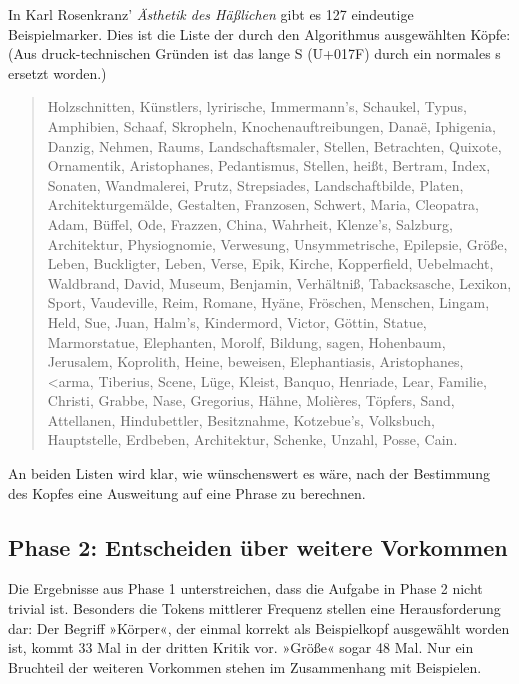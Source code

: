 \documentclass{article}
\newcommand*{\lit}{\textit}%
\begin{document}
In Karl Rosenkranz' \lit{Ästhetik des
  Häßlichen} \parencite{Rosenkranz1853a} gibt es 127 eindeutige
Beispielmarker. Dies ist die Liste der durch den Algorithmus
ausgewählten Köpfe: (Aus druck-technischen Gründen ist das lange S
(U+017F) durch ein normales s ersetzt worden.)

\begin{quote}
  Holzschnitten, Künstlers, lyrirische, Immermann's, Schaukel, Typus,
  Amphibien, Schaaf, Skropheln, Knochenauftreibungen, Danaë,
  Iphigenia, Danzig, Nehmen, Raums, Landschaftsmaler, Stellen,
  Betrachten, Quixote, Ornamentik, Aristophanes, Pedantismus, Stellen,
  heißt, Bertram, Index, Sonaten, Wandmalerei, Prutz, Strepsiades,
  Landschaftbilde, Platen, Architekturgemälde, Gestalten, Franzosen,
  Schwert, Maria, Cleopatra, Adam, Büffel, Ode, Frazzen, China,
  Wahrheit, Klenze's, Salzburg, Architektur, Physiognomie, Verwesung,
  Unsymmetrische, Epilepsie, Größe, Leben, Buckligter, Leben, Verse,
  Epik, Kirche, Kopperfield, Uebelmacht, Waldbrand, David, Museum,
  Benjamin, Verhältniß, Tabacksasche, Lexikon, Sport, Vaudeville,
  Reim, Romane, Hyäne, Fröschen, Menschen, Lingam, Held, Sue, Juan,
  Halm's, Kindermord, Victor, Göttin, Statue, Marmorstatue,
  Elephanten, Morolf, Bildung, sagen, Hohenbaum, Jerusalem, Koprolith,
  Heine, beweisen, Elephantiasis, Aristophanes,
  \foreignlanguage{polutonikogreek}{<arma}, %
  Tiberius, Scene, Lüge, Kleist, Banquo, Henriade, Lear, Familie,
  Christi, Grabbe, Nase, Gregorius, Hähne, Molières, Töpfers, Sand,
  Attellanen, Hindubettler, Besitznahme, Kotzebue's, Volksbuch,
  Hauptstelle, Erdbeben, Architektur, Schenke, Unzahl, Posse, Cain.
\end{quote}

An beiden Listen wird klar, wie wünschenswert es wäre, nach der
Bestimmung des Kopfes eine Ausweitung auf eine Phrase zu berechnen.

\subsection{Phase 2: Entscheiden über weitere Vorkommen}

Die Ergebnisse aus Phase 1 unterstreichen, dass die Aufgabe in Phase 2
nicht trivial ist. Besonders die Tokens mittlerer Frequenz stellen
eine Herausforderung dar: Der Begriff »Körper«, der einmal korrekt als
Beispielkopf ausgewählt worden ist, kommt 33 Mal in der dritten Kritik
vor. »Größe« sogar 48 Mal. Nur ein Bruchteil der weiteren Vorkommen
stehen im Zusammenhang mit Beispielen.
\end{document}

